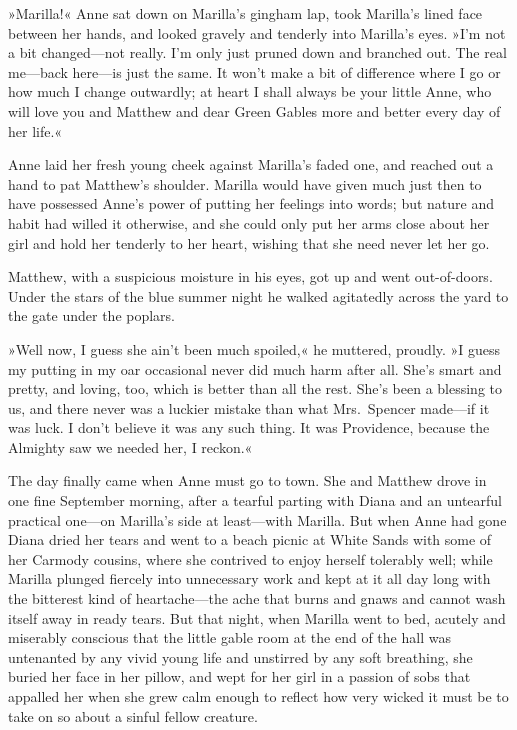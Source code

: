 »Marilla!« Anne sat down on Marilla's gingham lap, took Marilla's lined face between her hands, and looked gravely and tenderly into Marilla's eyes. »I'm not a bit changed—not really. I'm only just pruned down and branched out. The real me—back here—is just the same. It won't make a bit of difference where I go or how much I change outwardly; at heart I shall always be your little Anne, who will love you and Matthew and dear Green Gables more and better every day of her life.«

Anne laid her fresh young cheek against Marilla's faded one, and reached out a hand to pat Matthew's shoulder. Marilla would have given much just then to have possessed Anne's power of putting her feelings into words; but nature and habit had willed it otherwise, and she could only put her arms close about her girl and hold her tenderly to her heart, wishing that she need never let her go.

Matthew, with a suspicious moisture in his eyes, got up and went out-of-doors. Under the stars of the blue summer night he walked agitatedly across the yard to the gate under the poplars.

»Well now, I guess she ain't been much spoiled,« he muttered, proudly. »I guess my putting in my oar occasional never did much harm after all. She's smart and pretty, and loving, too, which is better than all the rest. She's been a blessing to us, and there never was a luckier mistake than what Mrs.~Spencer made—if it was luck. I don't believe it was any such thing. It was Providence, because the Almighty saw we needed her, I reckon.«

The day finally came when Anne must go to town. She and Matthew drove in one fine September morning, after a tearful parting with Diana and an untearful practical one—on Marilla's side at least—with Marilla. But when Anne had gone Diana dried her tears and went to a beach picnic at White Sands with some of her Carmody cousins, where she contrived to enjoy herself tolerably well; while Marilla plunged fiercely into unnecessary work and kept at it all day long with the bitterest kind of heartache—the ache that burns and gnaws and cannot wash itself away in ready tears. But that night, when Marilla went to bed, acutely and miserably conscious that the little gable room at the end of the hall was untenanted by any vivid young life and unstirred by any soft breathing, she buried her face in her pillow, and wept for her girl in a passion of sobs that appalled her when she grew calm enough to reflect how very wicked it must be to take on so about a sinful fellow creature.

